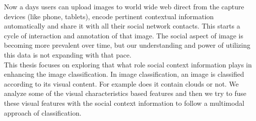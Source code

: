 \hspace*{1cm} Now a days users can upload images to world wide web direct from the capture devices (like phone, tablets), encode pertinent contextual information automatically and share it with all their social network contacts. This starts a cycle of interaction and annotation of that image. The social aspect of image is becoming more prevalent over time, but our understanding and power of utilizing this data is not expanding with that pace.\\
This thesis focuses on exploring that what role social context information plays in enhancing the image classification. In image classification, an image is classified according to its visual content. For example does it contain clouds or not. We analyze some of the visual characteristics based features and then we try to fuse these visual features with the social context information to follow a multimodal approach of classification. \\
